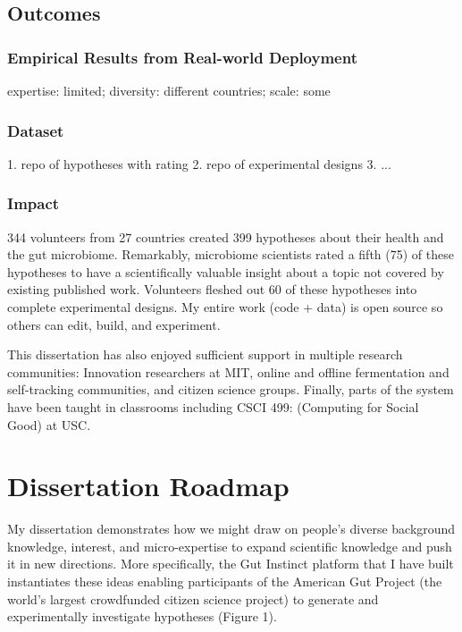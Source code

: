 \subsection{Outcomes}
\subsubsection{Empirical Results from Real-world Deployment}
expertise: limited; diversity: different countries; scale: some

\subsubsection{Dataset}
1. repo of hypotheses with rating
2. repo of experimental designs
3. ...

\subsubsection{Impact}
344 volunteers from 27 countries created 399 hypotheses about their health and the gut microbiome. Remarkably, microbiome scientists rated a fifth (75) of these hypotheses to have a scientifically valuable insight about a topic not covered by existing published work. Volunteers fleshed out 60 of these hypotheses into complete experimental designs. My entire work (code + data) is open source so others can edit, build, and experiment.

This dissertation has also enjoyed sufficient support in multiple research communities: Innovation researchers at MIT, online and offline fermentation and self-tracking communities, and citizen science groups. Finally, parts of the system have been taught in classrooms including CSCI 499: (Computing for Social Good) at USC. 

\section{Dissertation Roadmap}


My dissertation demonstrates how we might draw on people’s diverse background knowledge, interest, and micro-expertise to expand scientific knowledge and push it in new directions. More specifically, the Gut Instinct platform that I have built instantiates these ideas enabling participants of the American Gut Project (the world’s largest crowdfunded citizen science project) to generate and experimentally investigate hypotheses (Figure 1). 


